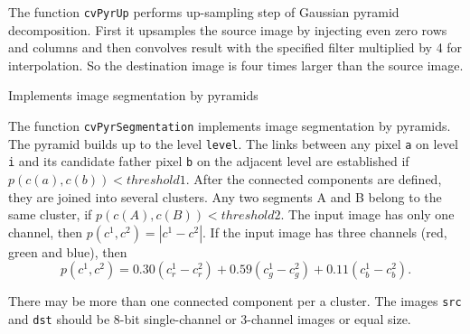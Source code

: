 The function \texttt{cvPyrUp} performs up-sampling step of Gaussian pyramid decomposition. First it upsamples the source image by injecting even zero rows and columns and then convolves result with the specified filter multiplied by 4 for interpolation. So the destination image is four times larger than the source image.

\label{PyrSegmentation}

Implements image segmentation by pyramids


\begin{description}
\end{description}

The function \texttt{cvPyrSegmentation} implements image segmentation by pyramids. The pyramid builds up to the level \texttt{level}. The links between any pixel \texttt{a} on level \texttt{i} and its candidate father pixel \texttt{b} on the adjacent level are established if
$p(c(a),c(b))<threshold1$.
After the connected components are defined, they are joined into several clusters.
Any two segments A and B belong to the same cluster, if $p(c(A),c(B))<threshold2$.
The input image has only one channel, then $p(c^1,c^2)=|c^1-c^2|$.
If the input image has three channels (red, green and blue), then
\[
  p(c^1,c^2) = 0.30 (c^1_r - c^2_r) +
               0.59 (c^1_g - c^2_g) +
               0.11 (c^1_b - c^2_b).
\]

There may be more than one connected component per a cluster. The images \texttt{src} and \texttt{dst} should be 8-bit single-channel or 3-channel images or equal size.


